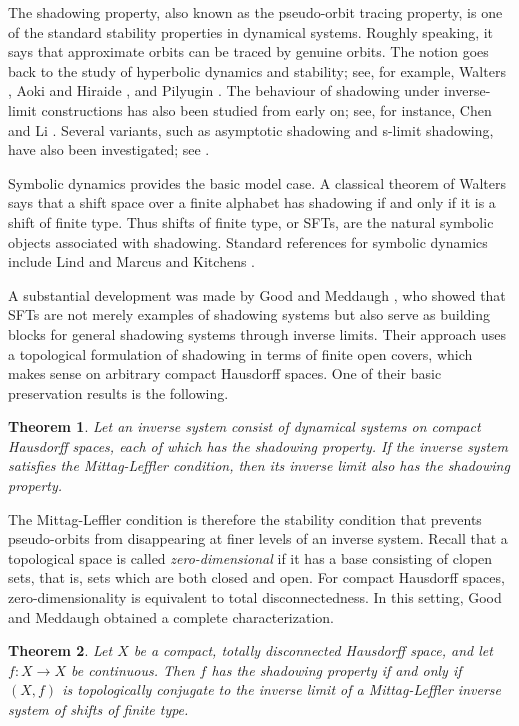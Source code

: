 \documentclass[12pt]{amsart}
\newtheorem{theorem}{Theorem}[section]
\theoremstyle{definition}
\numberwithin{equation}{section}
\theoremstyle{remark}
\begin{document}
The shadowing property, also known as the pseudo-orbit tracing property, is one
of the standard stability properties in dynamical systems. Roughly speaking, it
says that approximate orbits can be traced by genuine orbits. The notion goes
back to the study of hyperbolic dynamics and stability; see, for example,
Walters \cite{Walters}, Aoki and Hiraide \cite{AH}, and Pilyugin \cite{Pil}.
The behaviour of shadowing under inverse-limit constructions has also been
studied from early on; see, for instance, Chen and Li \cite{CL}. Several
variants, such as asymptotic shadowing and s-limit shadowing, have also been
investigated; see \cite{GOP,MS}.

Symbolic dynamics provides the basic model case. A classical theorem of Walters
\cite{Walters} says that a shift space over a finite alphabet has shadowing if
and only if it is a shift of finite type. Thus shifts of finite type, or SFTs,
are the natural symbolic objects associated with shadowing. Standard references
for symbolic dynamics include Lind and Marcus \cite{LM} and Kitchens \cite{Kit}.

A substantial development was made by Good and Meddaugh \cite{GM}, who showed
that SFTs are not merely examples of shadowing systems but also serve as
building blocks for general shadowing systems through inverse limits. Their
approach uses a topological formulation of shadowing in terms of finite open
covers, which makes sense on arbitrary compact Hausdorff spaces. One of their
basic preservation results is the following.

\begin{theorem}\cite[Theorem 8]{GM}\label{thm:GM8}
Let an inverse system consist of dynamical systems on compact Hausdorff spaces,
each of which has the shadowing property. If the inverse system satisfies the
Mittag-Leffler condition, then its inverse limit also has the shadowing property.
\end{theorem}

The Mittag-Leffler condition is therefore the stability condition that prevents
pseudo-orbits from disappearing at finer levels of an inverse system. Recall
that a topological space is called \emph{zero-dimensional} if it has a base
consisting of clopen sets, that is, sets which are both closed and open. For
compact Hausdorff spaces, zero-dimensionality is equivalent to total
disconnectedness. In this setting, Good and Meddaugh obtained a complete
characterization.


\begin{theorem}\cite[Theorem 18]{GM}\label{thm:GM18}
Let $X$ be a compact, totally disconnected Hausdorff space, and let
$f:X\to X$ be continuous. Then $f$ has the shadowing property if and only if
$(X,f)$ is topologically conjugate to the inverse limit of a Mittag-Leffler
inverse system of shifts of finite type.
\end{theorem}
\end{document}
